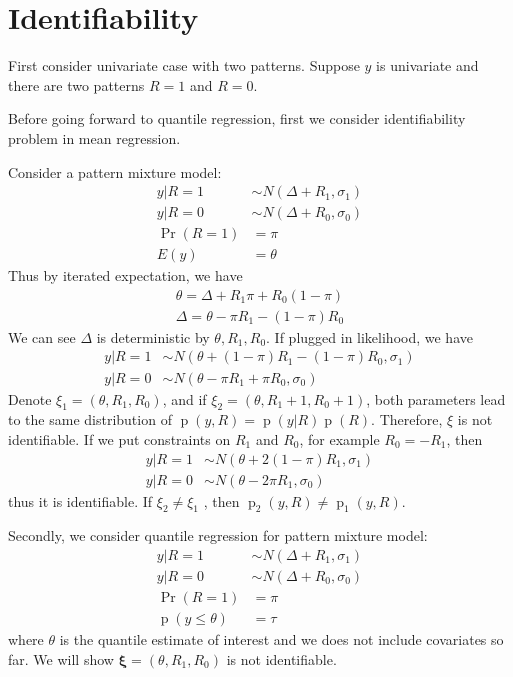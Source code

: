 \documentclass[12pt]{article}
\DeclareMathOperator{\pr}{p}
\DeclareMathOperator{\prob}{Pr}
\begin{document}
\section{Identifiability}

First consider univariate case with two patterns. Suppose $y$ is
univariate and there are two patterns $R = 1$ and $R = 0$.

Before going forward to quantile regression, first we consider
identifiability problem in mean regression.

Consider a pattern mixture model:
\begin{align*}
  y | R = 1 & \sim N(\Delta + R_1 , \sigma_1) \\
  y | R = 0 & \sim N(\Delta + R_0, \sigma_0) \\
  \prob (R = 1) & = \pi \\
  E (y ) & = \theta
\end{align*}
Thus by iterated expectation, we have
\begin{align*}
  \theta = \Delta + R_1\pi + R_0(1-\pi) \\
  \Delta = \theta - \pi R_1 - (1 - \pi)R_0
\end{align*}
We can see $\Delta$ is deterministic by $\theta, R_1, R_0$. If plugged
in likelihood, we have
\begin{align*}
  y | R = 1 & \sim N(\theta + (1 - \pi)R_1 - (1 - \pi)R_0, \sigma_1) \\
  y | R = 0 & \sim N(\theta - \pi R_1 + \pi R_0, \sigma_0)
\end{align*}
Denote $\xi_1 = (\theta , R_1, R_0)$, and if $\xi_2 = (\theta, R_1+ 1,
R_0+1)$, both parameters lead to the same distribution of $\pr(y, R) =
\pr(y|R)\pr(R)$. Therefore, $\xi$ is not identifiable.  If we put
constraints on $R_1$ and $R_0$, for example $R_0 = -R_1$, then
\begin{align*}
  y | R = 1 & \sim N(\theta + 2(1 - \pi)R_1 , \sigma_1) \\
  y | R = 0 & \sim N(\theta - 2\pi R_1 , \sigma_0)
\end{align*}
thus it is identifiable. If $\xi_2 \neq \xi_1$ , then $\pr_2(y, R)
\neq \pr_1(y, R)$.

Secondly, we consider quantile regression for pattern mixture model:
\begin{align*}
  y | R = 1 & \sim N(\Delta + R_1 , \sigma_1) \\
  y | R = 0 & \sim N(\Delta + R_0, \sigma_0) \\
  \prob (R = 1) & = \pi \\
  \pr (y \leq \theta ) & = \tau
\end{align*}
where $\theta$ is the quantile estimate of interest and we does not
include covariates so far. We will show $\bm \xi = (\theta, R_1, R_0)
$ is not identifiable.
\end{document}
